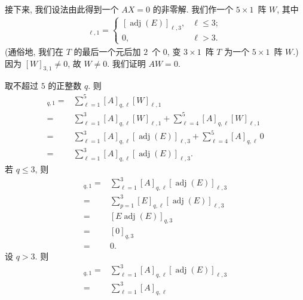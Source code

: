 \begin{example}
    接下来, 我们设法由此得到一个 \(AX = 0\)
    的非零解.
    我们作一个 \(5 \times 1\)~阵 \(W\), 其中
    \begin{align*}
        [W]_{\ell,1}
        = \begin{cases}
              [\operatorname{adj} {(E)}]_{\ell,3},
                 & \ell \leq 3; \\
              0, & \ell > 3.
          \end{cases}
    \end{align*}
    (通俗地, 我们在 \(T\) 的最后一个元后加 \(2\)~个 \(0\),
    变 \(3 \times 1\)~阵 \(T\)
    为一个 \(5 \times 1\)~阵 \(W\).)
    因为 \([W]_{3,1} \neq 0\),
    故 \(W \neq 0\).
    我们证明 \(AW = 0\).

    取不超过 \(5\) 的正整数 \(q\).
    则
    \begin{align*}
        [AW]_{q,1}
        = {} &
        \sum_{\ell = 1}^{5}
        {[A]_{q,\ell} [W]_{\ell,1}}
        \\
        = {} &
        \sum_{\ell = 1}^{3}
        {[A]_{q,\ell} [W]_{\ell,1}}
        +
        \sum_{\ell = 4}^{5}
        {[A]_{q,\ell} [W]_{\ell,1}}
        \\
        = {} &
        \sum_{\ell = 1}^{3}
        {[A]_{q,\ell} [\operatorname{adj} {(E)}]_{\ell,3}}
        +
        \sum_{\ell = 4}^{5}
        {[A]_{q,\ell}\, 0}
        \\
        = {} &
        \sum_{\ell = 1}^{3}
        {[A]_{q,\ell} [\operatorname{adj} {(E)}]_{\ell,3}}.
    \end{align*}
    若 \(q \leq 3\), 则
    \begin{align*}
        [AW]_{q,1}
        = {} &
        \sum_{\ell=1}^{3}
        {[A]_{q,\ell}
            [\operatorname{adj} {(E)}]_{\ell,3}}
        \\
        = {} &
        \sum_{p=1}^{3}
        {[E]_{q,\ell}
            [\operatorname{adj} {(E)}]_{\ell,3}}
        \\
        = {} &
        [E \operatorname{adj} {(E)}]_{q,3}
        \\
        = {} &
        [0]_{q,3}
        \\
        = {} & 0.
    \end{align*}
    设 \(q > 3\).
    则
    \begin{align*}
        [AW]_{q,1}
        = {} &
        \sum_{\ell=1}^{3}
        {[A]_{q,\ell}
            [\operatorname{adj} {(E)}]_{\ell,3}}
        \\
        = {} &
        \sum_{\ell=1}^{3}
        {[A]_{q,\ell}
}
\end{align*}
\end{example}
